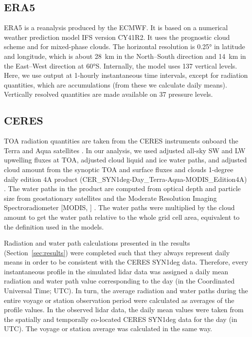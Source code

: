 \documentclass[draft]{agujournal2019}
\begin{document}
\subsection{ERA5}

ERA5 \cite{era5} is a reanalysis produced by the ECMWF. It is based on a numerical weather prediction model IFS version CY41R2. It uses the  prognostic cloud scheme and  for mixed-phase clouds. The horizontal resolution is 0.25° in latitude and longitude, which is about 28~km in the North--South direction and 14~km in the East--West direction at 60°S. Internally, the model uses 137 vertical levels. Here, we use output at 1-hourly instantaneous time intervals, except for radiation quantities, which are accumulations (from these we calculate daily means). Vertically resolved quantities are made available on 37 pressure levels.

\subsection{CERES}
\label{sec:ceres}

TOA radiation quantities are taken from the CERES instruments onboard the Terra and Aqua satellites \cite{wielicki1996,loeb2018}. In our analysis, we used adjusted all-sky SW and LW upwelling fluxes at TOA, adjusted cloud liquid and ice water paths, and adjusted cloud amount from the synoptic TOA and surface fluxes and clouds 1-degree daily edition 4A product (CER\_SYN1deg-Day\_Terra-Aqua-MODIS\_Edition4A) \cite{doelling2013,doelling2016}. The water paths in the product are computed from optical depth and particle size from geostationary satellites and the Moderate Resolution Imaging Spectroradiometer [MODIS, ] \cite{ceres2025}. The water paths were multiplied by the cloud amount to get the water path relative to the whole grid cell area, equivalent to the definition used in the models.

Radiation and water path calculations presented in the results (Section~\ref{sec:results}) were completed such that they always represent daily means in order to be consistent with the CERES SYN1deg data. Therefore, every instantaneous profile in the simulated lidar data was assigned a daily mean radiation and water path value corresponding to the day (in the Coordinated Universal Time; UTC). In turn, the average radiation and water paths during the entire voyage or station observation period were calculated as averages of the profile values. In the observed lidar data, the daily mean values were taken from the spatially and temporally co-located CERES SYN1deg data for the day (in UTC). The voyage or station average was calculated in the same way.
\end{document}

